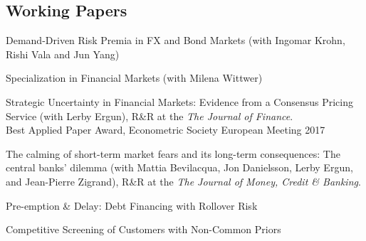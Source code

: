 \documentclass[margin,line, 11pt]{res}
\newenvironment{list1}{
  \begin{list}{\ding{113}}{%
      \setlength{\itemsep}{0in}
      \setlength{\parsep}{0in} \setlength{\parskip}{0in}
      \setlength{\topsep}{0in} \setlength{\partopsep}{0in} 
      \setlength{\leftmargin}{0.17in}}}{\end{list}}
\begin{document}
\begin{resume}
\section{\sc Working Papers}
\begin{list1}
\item[] Demand-Driven Risk Premia in FX and Bond Markets (with Ingomar Krohn, Rishi Vala and Jun Yang)
\vspace*{0.2cm}
\item[] Specialization in Financial Markets (with Milena Wittwer)
\vspace*{0.2cm}
\item[] Strategic Uncertainty in Financial Markets: Evidence from a Consensus Pricing Service (with Lerby Ergun), R\&R at the \textit{The Journal of Finance}.\\
Best Applied Paper Award, Econometric Society European Meeting 2017
\vspace*{0.2cm}
\item[] The calming of short-term market fears and its long-term consequences: The central banks' dilemma (with Mattia Bevilacqua, Jon Danielsson, Lerby Ergun,  and Jean-Pierre Zigrand), R\&R at the \textit{The Journal of Money, Credit \& Banking}.
\vspace*{0.2cm}
\item[] Pre-emption \& Delay: Debt Financing with Rollover Risk
\vspace*{0.2cm}
\item[] Competitive Screening of Customers with Non-Common Priors
\end{list1}




\end{resume}
\end{document}
